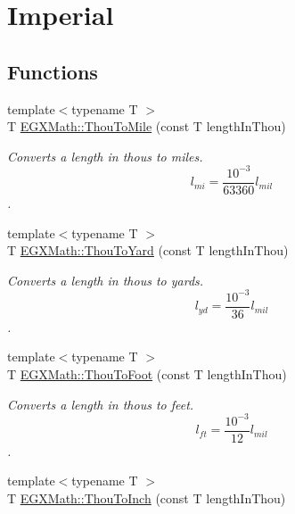 \hypertarget{group___e_g_x_math-_conversions-_length_conversions-_imperial-_thou-_imperial}{}\section{Imperial}
\label{group___e_g_x_math-_conversions-_length_conversions-_imperial-_thou-_imperial}
\subsection*{Functions}
\begin{DoxyCompactItemize}
\item 
{\footnotesize template$<$typename T $>$ }\\T \mbox{\hyperlink{group___e_g_x_math-_conversions-_length_conversions-_imperial-_thou-_imperial_ga1a3d3b11a614cf1e7086506cc0dc1430}{E\+G\+X\+Math\+::\+Thou\+To\+Mile}} (const T length\+In\+Thou)
\begin{DoxyCompactList}\small\item\em Converts a length in thous to miles. \[ l_{mi}=\frac{10^{-3}}{63360} l_{mil} \]. \end{DoxyCompactList}\item 
{\footnotesize template$<$typename T $>$ }\\T \mbox{\hyperlink{group___e_g_x_math-_conversions-_length_conversions-_imperial-_thou-_imperial_ga15eba45029ba30529fbd0038af9de3a2}{E\+G\+X\+Math\+::\+Thou\+To\+Yard}} (const T length\+In\+Thou)
\begin{DoxyCompactList}\small\item\em Converts a length in thous to yards. \[ l_{yd}= \frac{10^{-3}}{36} l_{mil} \]. \end{DoxyCompactList}\item 
{\footnotesize template$<$typename T $>$ }\\T \mbox{\hyperlink{group___e_g_x_math-_conversions-_length_conversions-_imperial-_thou-_imperial_ga10138630a7c3b1f80dfb4a34552e0af5}{E\+G\+X\+Math\+::\+Thou\+To\+Foot}} (const T length\+In\+Thou)
\begin{DoxyCompactList}\small\item\em Converts a length in thous to feet. \[ l_{ft}= \frac{10^{-3}}{12} l_{mil} \]. \end{DoxyCompactList}\item 
{\footnotesize template$<$typename T $>$ }\\T \mbox{\hyperlink{group___e_g_x_math-_conversions-_length_conversions-_imperial-_thou-_imperial_gad8bbba80b7d752a5edd4453fef6c0772}{E\+G\+X\+Math\+::\+Thou\+To\+Inch}} (const T length\+In\+Thou)

\end{DoxyCompactItemize}
